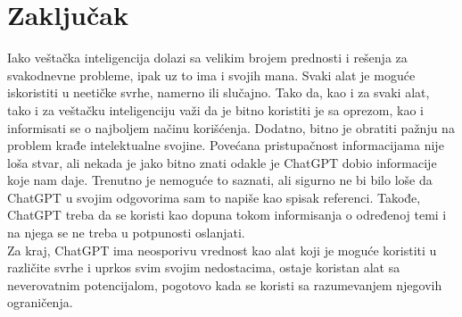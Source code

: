 \documentclass[fleqn, 12pt]{article}
\begin{document}
\newpage
\section{Zaključak}
\begin{text}
Iako veštačka inteligencija dolazi sa velikim brojem prednosti i  rešenja za svakodnevne probleme, ipak uz to ima i svojih mana. Svaki alat je moguće iskoristiti u neetičke svrhe, namerno ili slučajno. Tako da, kao i za svaki alat, tako i za veštačku inteligenciju važi da je bitno koristiti je sa oprezom, kao i informisati se o najboljem načinu korišćenja. Dodatno, bitno je obratiti pažnju na problem krađe intelektualne svojine. Povećana pristupačnost informacijama nije loša stvar, ali nekada je jako bitno znati odakle je ChatGPT dobio informacije koje nam daje. Trenutno je nemoguće to saznati, ali sigurno ne bi bilo loše da ChatGPT u svojim odgovorima sam to napiše kao spisak referenci. Takođe, ChatGPT treba da se koristi kao dopuna tokom informisanja o određenoj temi i na njega se ne treba u potpunosti oslanjati.
\\
Za kraj, ChatGPT ima neosporivu vrednost kao alat koji je moguće koristiti u različite svrhe i uprkos svim svojim nedostacima, ostaje koristan alat sa neverovatnim potencijalom, pogotovo kada se koristi sa razumevanjem njegovih ograničenja.
\end{text}
\end{document}
